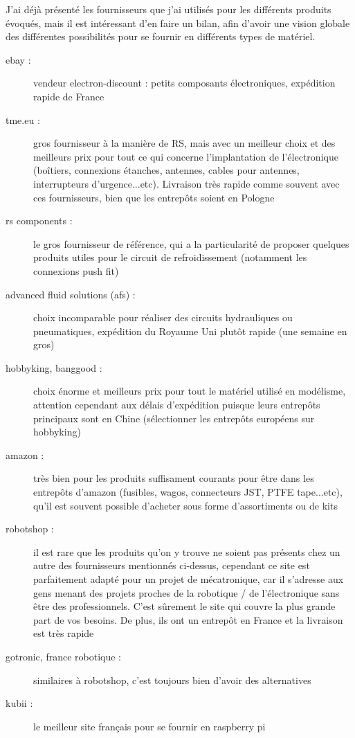 \documentclass[a4paper, 11pt]{report}
\begin{document}
J'ai déjà présenté les fournisseurs que j'ai utilisés pour les différents
produits évoqués, mais il est intéressant d'en faire un bilan, afin
d'avoir une vision globale des différentes possibilités pour se fournir
en différents types de matériel.
\begin{description}
\item[ebay :] vendeur electron-discount : petits composants électroniques,
expédition rapide de France
\item[tme.eu :] gros fournisseur à la manière de RS, mais avec un meilleur
choix et des meilleurs prix pour tout ce qui concerne l'implantation
de l'électronique (boîtiers, connexions étanches, antennes, cables
pour antennes, interrupteurs d'urgence...etc). Livraison très rapide
comme souvent avec ces fournisseurs, bien que les entrepôts soient
en Pologne
\item[rs components :] le gros fournisseur de référence, qui a la particularité
de proposer quelques produits utiles pour le circuit de refroidissement
(notamment les connexions push fit)
\item[advanced fluid solutions (afs) :] choix incomparable pour réaliser
des circuits hydrauliques ou pneumatiques, expédition du Royaume Uni
plutôt rapide (une semaine en gros)
\item[hobbyking, banggood :] choix énorme et meilleurs prix pour tout le
matériel utilisé en modélisme, attention cependant aux délais d'expédition
puisque leurs entrepôts principaux sont en Chine (sélectionner les
entrepôts européens sur hobbyking)
\item[amazon :] très bien pour les produits suffisament courants pour être
dans les entrepôts d'amazon (fusibles, wagos, connecteurs JST, PTFE
tape...etc), qu'il est souvent possible d'acheter sous forme d'assortiments
ou de kits
\item[robotshop :] il est rare que les produits qu'on y trouve ne soient
pas présents chez un autre des fournisseurs mentionnés ci-dessus,
cependant ce site est parfaitement adapté pour un projet de mécatronique,
car il s'adresse aux gens menant des projets proches de la robotique
/ de l'électronique sans être des professionnels. C'est sûrement le
site qui couvre la plus grande part de vos besoins. De plus, ils ont
un entrepôt en France et la livraison est très rapide
\item[gotronic, france robotique :] similaires à robotshop, c'est toujours
bien d'avoir des alternatives
\item[kubii :] le meilleur site français pour se fournir en raspberry pi
\end{description}
\end{document}
